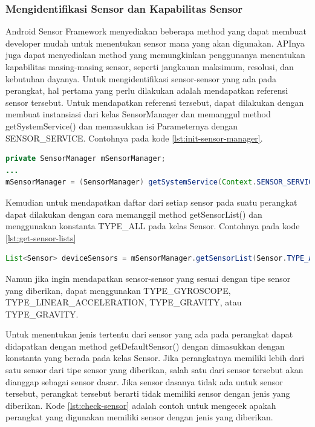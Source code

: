 \subsubsection{Mengidentifikasi Sensor dan Kapabilitas Sensor}
\label{sssec:mengidentifikasi_sensor_dan_kapabilitas_sensor}
Android Sensor Framework menyediakan beberapa method yang dapat membuat developer mudah untuk menentukan sensor mana yang akan digunakan. APInya juga dapat menyediakan method yang memungkinkan penggunanya menentukan kapabilitas masing-masing sensor, seperti jangkauan maksimum, resolusi, dan kebutuhan dayanya.
Untuk mengidentifikasi sensor-sensor yang ada pada perangkat, hal pertama yang perlu dilakukan adalah mendapatkan referensi sensor tersebut. Untuk mendapatkan referensi tersebut, dapat dilakukan dengan membuat instansiasi dari kelas SensorManager dan memanggul method getSystemService() dan memasukkan isi Parameternya dengan SENSOR\_SERVICE. Contohnya pada kode \ref{lst:init-sensor-manager}.
 
\begin{lstlisting}[caption={Contoh inisialisasi kelas SensorManager},label={lst:init-sensor-manager},language=java]
private SensorManager mSensorManager;
...
mSensorManager = (SensorManager) getSystemService(Context.SENSOR_SERVICE);
\end{lstlisting}

Kemudian untuk mendapatkan daftar dari setiap sensor pada suatu perangkat dapat dilakukan dengan cara memanggil method getSensorList() dan menggunakan konstanta TYPE\_ALL pada kelas Sensor. Contohnya pada kode \ref{lst:get-sensor-lists}

\begin{lstlisting}[caption={Contoh untuk mendapatkan daftar dari setiap sensor yang ada},label={lst:get-sensor-lists},language=java]
List<Sensor> deviceSensors = mSensorManager.getSensorList(Sensor.TYPE_ALL);
\end{lstlisting}

Namun jika ingin mendapatkan sensor-sensor yang sesuai dengan tipe sensor yang diberikan, dapat menggunakan TYPE\_GYROSCOPE, TYPE\_LINEAR\_ACCELERATION, TYPE\_GRAVITY, atau TYPE\_GRAVITY.

Untuk menentukan jenis tertentu dari sensor yang ada pada perangkat dapat didapatkan dengan method getDefaultSensor() dengan dimasukkan dengan konstanta yang berada pada kelas Sensor. Jika perangkatnya memiliki lebih dari satu sensor dari tipe sensor yang diberikan, salah satu dari sensor tersebut akan dianggap sebagai sensor dasar. Jika sensor dasanya tidak ada untuk sensor tersebut, perangkat tersebut berarti tidak memiliki sensor dengan jenis yang diberikan. Kode \ref{lst:check-sensor} adalah contoh untuk mengecek apakah perangkat yang digunakan memiliki sensor dengan jenis yang diberikan.

